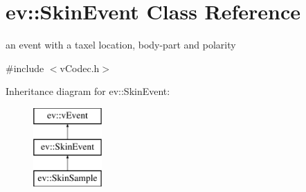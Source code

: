 \hypertarget{classev_1_1SkinEvent}{}\section{ev\+:\+:Skin\+Event Class Reference}
\label{classev_1_1SkinEvent}


an event with a taxel location, body-\/part and polarity  




{\ttfamily \#include $<$v\+Codec.\+h$>$}

Inheritance diagram for ev\+:\+:Skin\+Event\+:\begin{figure}[H]
\begin{center}
\leavevmode
\includegraphics[height=3.000000cm]{classev_1_1SkinEvent}
\end{center}
\end{figure}

